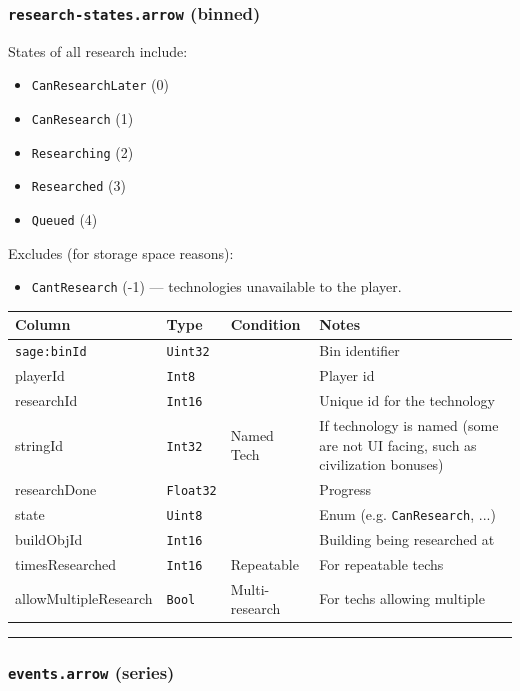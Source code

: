 \subsubsection*{\texttt{research-states.arrow} (binned)}

States of all research include:
\begin{itemize}
  \item \texttt{CanResearchLater} (0)
  \item \texttt{CanResearch} (1)
  \item \texttt{Researching} (2)
  \item \texttt{Researched} (3)
  \item \texttt{Queued} (4)
\end{itemize}

Excludes (for storage space reasons):
\begin{itemize}
  \item \texttt{CantResearch} (-1) — technologies unavailable to the player.
\end{itemize}

\begin{longtable}{@{}p{}p{}p{}p{}@{}}
  \toprule
  Column & Type & Condition & Notes \\
  \midrule
  \endhead
  \texttt{sage:binId} & \texttt{Uint32} & & Bin identifier \\
  playerId & \texttt{Int8} & & Player id \\
  researchId & \texttt{Int16} & & Unique id for the technology \\
  stringId & \texttt{Int32} & Named Tech & If technology is named (some are not UI facing, such as civilization bonuses) \\
  researchDone & \texttt{Float32} & & Progress \\
  state & \texttt{Uint8} & & Enum (e.g. \texttt{CanResearch}, ...) \\
  buildObjId & \texttt{Int16} &  & Building being researched at \\
  timesResearched & \texttt{Int16} & Repeatable & For repeatable techs \\
  allowMultipleResearch & \texttt{Bool} & Multi-research & For techs allowing multiple \\
  \bottomrule
\end{longtable}

\par\noindent\rule{\textwidth}{0.4pt}

\subsubsection*{\texttt{events.arrow} (series)}

